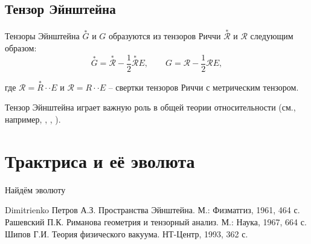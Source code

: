 \documentclass[14pt,a4paper]{extarticle}
\begin{document}
\subsection{Тензор Эйнштейна}
Тензоры Эйнштейна $\overset{*}{G}$ и $G$ образуются из тензоров Риччи $\overset{*}{\mathcal{R}}$ и $\mathcal{R}$ следующим образом:
\begin{equation}\label{eq39}
	\overset{*}{G} = \overset{*}{\mathcal{R}} - \frac{1}{2}\overset{*}{\mathcal{R}}E, \qquad G = \mathcal{R} - \frac{1}{2}\mathcal{R}E,
\end{equation}

где $\mathcal{R} = \overset{*}{R} \cdot \cdot E$ и $\mathcal{R} = R \cdot \cdot E$ -- свертки тензоров Риччи с метрическим тензором.

Тензор Эйнштейна играет важную роль в общей теории относительности (см., например, \cite{Petrov}, \cite{Rashevskiy}, \cite{Shipov}).




\section{Трактриса и её эволюта}
Найдём эволюту 


















\clearpage
{}
\begin{thebibliography}{3}
	Dimitrienko
	Петров А.З. Пространства Эйнштейна. М.: Физматгиз, 1961, 464 с.
	Рашевский П.К. Риманова геометрия и тензорный анализ. М.: Наука, 1967, 664 с.
	Шипов Г.И. Теория физического вакуума. НТ-Центр, 1993, 362 с.

\end{thebibliography}
\end{document}
